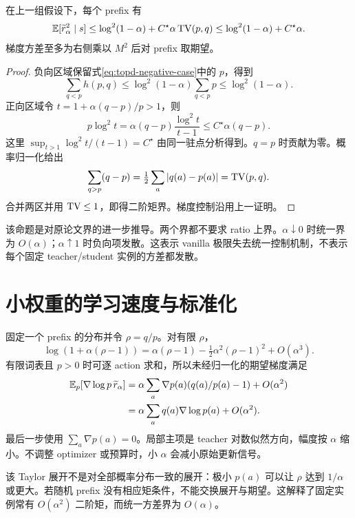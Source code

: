 \begin{proposition}[不含词表因子的二阶矩界]
\label{prop:topd-sharp-variance}
在上一组假设下，每个 prefix 有
\begin{equation}
 \mathbb{E}[\widetilde r_\alpha^2\mid s]
 \leq\log^2(1-\alpha)+C^\star\alpha\operatorname{TV}(p,q)
 \leq\log^2(1-\alpha)+C^\star\alpha.
 \label{eq:topd-sharper-variance}
\end{equation}
梯度方差至多为右侧乘以 $M^2$ 后对 prefix 取期望。
\end{proposition}
\begin{proof}
负向区域保留式\eqref{eq:topd-negative-case}中的 $p$，得到
\[
 \sum_{q<p}h(p,q)\leq\log^2(1-\alpha)\sum_{q<p}p\leq\log^2(1-\alpha).
\]
正向区域令 $t=1+\alpha(q-p)/p>1$，则
\[
 p\log^2t=\alpha(q-p)\frac{\log^2t}{t-1}\leq C^\star\alpha(q-p).
\]
这里 $\sup_{t>1}\log^2t/(t-1)=C^\star$ 由同一驻点分析得到。$q=p$ 时贡献为零。概率归一化给出
\[
 \sum_{q>p}(q-p)=\tfrac12\sum_a|q(a)-p(a)|=\operatorname{TV}(p,q).
\]
合并两区并用 $\operatorname{TV}\leq1$，即得二阶矩界。梯度控制沿用上一证明。
\end{proof}

该命题是对原论文界的进一步推导。两个界都不要求 ratio 上界。$\alpha\downarrow0$ 时统一界为 $O(\alpha)$；$\alpha\uparrow1$ 时负向项发散。这表示 vanilla 极限失去统一控制机制，不表示每个固定 teacher/student 实例的方差都发散。

\section{小权重的学习速度与标准化}

固定一个 prefix 的分布并令 $\rho=q/p$。对有限 $\rho$，
\begin{equation}
 \log(1+\alpha(\rho-1))
 =\alpha(\rho-1)-\tfrac12\alpha^2(\rho-1)^2+O(\alpha^3).
 \label{eq:topd-small-alpha}
\end{equation}
有限词表且 $p>0$ 时可逐 action 求和，所以未经归一化的期望梯度满足
\begin{align}
 \mathbb{E}_p[\nabla\log p\,\widetilde r_\alpha]
 &=\alpha\sum_a\nabla p(a)(q(a)/p(a)-1)+O(\alpha^2)\\
 &=\alpha\sum_aq(a)\nabla\log p(a)+O(\alpha^2).
 \label{eq:topd-small-alpha-gradient}
\end{align}
最后一步使用 $\sum_a\nabla p(a)=0$。局部主项是 teacher 对数似然方向，幅度按 $\alpha$ 缩小。不调整 optimizer 或预算时，小 $\alpha$ 会减小原始更新信号。

该 Taylor 展开不是对全部概率分布一致的展开：极小 $p(a)$ 可以让 $\rho$ 达到 $1/\alpha$ 或更大。若随机 prefix 没有相应矩条件，不能交换展开与期望。这解释了固定实例常有 $O(\alpha^2)$ 二阶矩，而统一方差界为 $O(\alpha)$。

